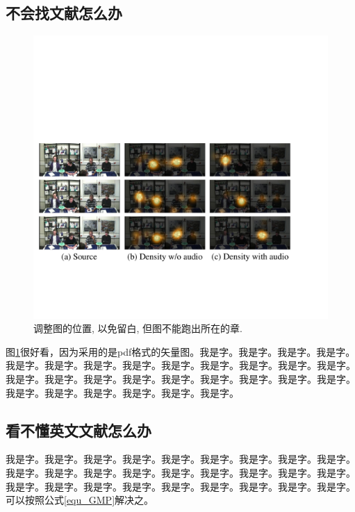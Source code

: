 \documentclass[supercite]{HustGraduPaper}
\theoremstyle{definition}
\begin{document}
\subsection{不会找文献怎么办}

\begin{figure}[htb]
	\setlength{\abovecaptionskip}{ 0.0cm}
	\setlength{\belowcaptionskip}{-0.5cm}
	\begin{center}
		\includegraphics[scale=0.25]{Fig3-1.pdf}
		\caption{调整图的位置, 以免留白, 但图不能跑出所在的章.}
		\label{fig3-1}
	\end{center}
\end{figure}

图\ref{fig3-1}很好看，因为采用的是pdf格式的矢量图。我是字。我是字。我是字。我是字。我是字。我是字。我是字。我是字。我是字。我是字。我是字。我是字。我是字。我是字。我是字。我是字。我是字。我是字。我是字。我是字。我是字。我是字。我是字。我是字。我是字。我是字。我是字。我是字。

\subsection{看不懂英文文献怎么办}

我是字。我是字。我是字。我是字。我是字。我是字。我是字。我是字。我是字。我是字。我是字。我是字。我是字。我是字。我是字。我是字。我是字。我是字。我是字。我是字。我是字。我是字。我是字。我是字。我是字。我是字。我是字。可以按照公式\ref{equ_GMP}解决之。
\end{document}
